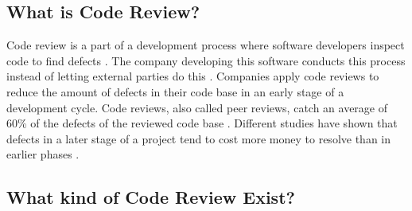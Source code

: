 \subsection*{What is Code Review?}

Code review is a part of a development process where software developers inspect code to find defects \autocite[47]{10.1109/MS.2003.1241366}.
The company developing this software conducts this process instead of letting external parties do this \autocite[47]{10.1109/MS.2003.1241366}.
Companies apply code reviews to reduce the amount of defects in their code base in an early stage of a development cycle.
Code reviews, also called peer reviews, catch an average of 60\% of the defects of the reviewed code base \autocite[136]{10.1109/2.962984}.
Different studies have shown that defects in a later stage of a project tend to cost more money to resolve than in earlier phases \autocite[135]{10.1109/2.962984} \autocite[21]{beck2000extreme}.

\subsection*{What kind of Code Review Exist?}

